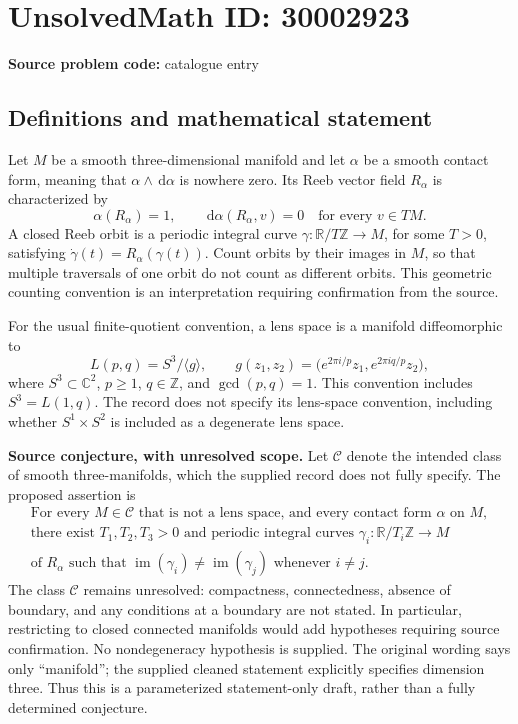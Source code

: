 \documentclass[11pt]{article}
\newcommand{\Z}{\mathbb{Z}}
\newcommand{\R}{\mathbb{R}}
\newcommand{\C}{\mathbb{C}}
\newcommand{\dd}{\,\mathrm{d}}
\begin{document}
\section*{UnsolvedMath ID: 30002923}
\textbf{Source problem code:} catalogue entry
\subsection{Definitions and mathematical statement}
Let \(M\) be a smooth three-dimensional manifold and let \(\alpha\) be a smooth contact form, meaning that \(\alpha\wedge\dd\alpha\) is nowhere zero. Its Reeb vector field \(R_\alpha\) is characterized by
\[
\alpha(R_\alpha)=1,\qquad \dd\alpha(R_\alpha,v)=0\quad\text{for every }v\in TM.
\]
A closed Reeb orbit is a periodic integral curve \(\gamma:\R/T\Z\to M\), for some \(T>0\), satisfying \(\dot\gamma(t)=R_\alpha(\gamma(t))\). Count orbits by their images in \(M\), so that multiple traversals of one orbit do not count as different orbits. This geometric counting convention is an interpretation requiring confirmation from the source.

For the usual finite-quotient convention, a lens space is a manifold diffeomorphic to
\[
L(p,q)=S^3/\langle g\rangle,\qquad g(z_1,z_2)=\bigl(e^{2\pi i/p}z_1,e^{2\pi iq/p}z_2\bigr),
\]
where \(S^3\subset\C^2\), \(p\geq1\), \(q\in\Z\), and \(\gcd(p,q)=1\). This convention includes \(S^3=L(1,q)\). The record does not specify its lens-space convention, including whether \(S^1\times S^2\) is included as a degenerate lens space.

\textbf{Source conjecture, with unresolved scope.} Let \(\mathcal C\) denote the intended class of smooth three-manifolds, which the supplied record does not fully specify. The proposed assertion is
\[
\begin{gathered}
\text{For every }M\in\mathcal C\text{ that is not a lens space, and every contact form }\alpha\text{ on }M,\\
\text{there exist }T_1,T_2,T_3>0\text{ and periodic integral curves }\gamma_i:\R/T_i\Z\to M\\
\text{of }R_\alpha\text{ such that }\operatorname{im}(\gamma_i)\neq\operatorname{im}(\gamma_j)\text{ whenever }i\neq j.
\end{gathered}
\]
The class \(\mathcal C\) remains unresolved: compactness, connectedness, absence of boundary, and any conditions at a boundary are not stated. In particular, restricting to closed connected manifolds would add hypotheses requiring source confirmation. No nondegeneracy hypothesis is supplied. The original wording says only ``manifold''; the supplied cleaned statement explicitly specifies dimension three. Thus this is a parameterized statement-only draft, rather than a fully determined conjecture.
\end{document}
